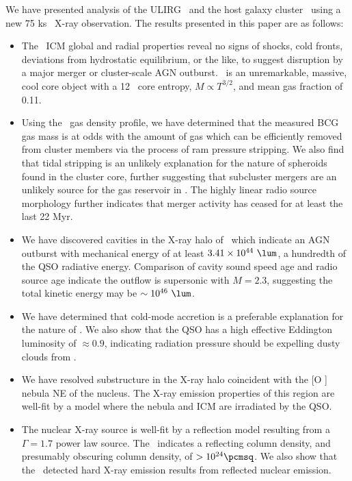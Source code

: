\documentclass[useAMS,usenatbib]{mn2e}
\begin{document}
We have presented analysis of the ULIRG \iras\ and the host galaxy
cluster \rxj\ using a new 75 ks \chandra\ X-ray observation. The
results presented in this paper are as follows:
\begin{itemize}
\item The \rxj\ ICM global and radial properties reveal no signs of
  shocks, cold fronts, deviations from hydrostatic equilibrium, or the
  like, to suggest disruption by a major merger or cluster-scale AGN
  outburst. \rxj\ is an unremarkable, massive, cool core object with a
  12 \ent\ core entropy, $M \propto T^{3/2}$, and mean gas fraction of
  0.11.
\item Using the \rxj\ gas density profile, we have determined that the
  measured BCG gas mass is at odds with the amount of gas which can be
  efficiently removed from cluster members via the process of ram
  pressure stripping. We also find that tidal stripping is an unlikely
  explanation for the nature of spheroids found in the cluster core,
  further suggesting that subcluster mergers are an unlikely source
  for the gas reservoir in \irs. The highly linear radio source
  morphology further indicates that merger activity has ceased for at
  least the last 22 Myr.
\item We have discovered cavities in the X-ray halo of \irs\ which
  indicate an AGN outburst with mechanical energy of at least $3.41
  \times 10^{44} ~\lum$, a hundredth of the QSO radiative
  energy. Comparison of cavity sound speed age and radio source age
  indicate the outflow is supersonic with $M = 2.3$, suggesting the
  total kinetic energy may be $\sim 10^{46} ~\lum$.
\item We have determined that cold-mode accretion is a preferable
  explanation for the nature of \irs. We also show that the QSO has a
  high effective Eddington luminosity of $\approx 0.9$, indicating
  radiation pressure should be expelling dusty clouds from \irs.
\item We have resolved substructure in the X-ray halo coincident with
  the [O ] nebula NE of the nucleus. The X-ray emission
  properties of this region are well-fit by a model where the nebula
  and ICM are irradiated by the QSO.
\item The nuclear X-ray source is well-fit by a reflection model
  resulting from a $\Gamma=1.7$ power law source. The
  \fekaew\ indicates a reflecting column density, and presumably
  obscuring column density, of $> 10^{24} \pcmsq$. We also show that
  the \bepposax\ detected hard X-ray emission results from reflected
  nuclear emission.
\end{itemize}
\end{document}
